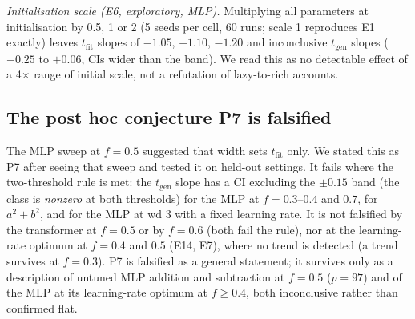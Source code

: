 \documentclass{article}
\begin{document}
\emph{Initialisation scale (E6, exploratory, MLP).} Multiplying all parameters at initialisation by 0.5, 1 or 2 (5 seeds per cell, 60 runs; scale 1 reproduces E1 exactly) leaves $t_{\mathrm{fit}}$ slopes of $-1.05$, $-1.10$, $-1.20$ and inconclusive $t_{\mathrm{gen}}$ slopes ($-0.25$ to $+0.06$, CIs wider than the band). We read this as no detectable effect of a 4$\times$ range of initial scale, not a refutation of lazy-to-rich accounts.

\subsection{The post hoc conjecture P7 is falsified}
The MLP sweep at $f=0.5$ suggested that width sets $t_{\mathrm{fit}}$ only. We stated this as P7 after seeing that sweep and tested it on held-out settings. It fails where the two-threshold rule is met: the $t_{\mathrm{gen}}$ slope has a CI excluding the $\pm0.15$ band (the class is \emph{nonzero} at both thresholds) for the MLP at $f=0.3$--$0.4$ and $0.7$, for $a^2+b^2$, and for the MLP at wd 3 with a fixed learning rate. It is not falsified by the transformer at $f=0.5$ or by $f=0.6$ (both fail the rule), nor at the learning-rate optimum at $f=0.4$ and $0.5$ (E14, E7), where no trend is detected (a trend survives at $f=0.3$). P7 is falsified as a general statement; it survives only as a description of untuned MLP addition and subtraction at $f=0.5$ ($p=97$) and of the MLP at its learning-rate optimum at $f\ge0.4$, both inconclusive rather than confirmed flat.
\end{document}
